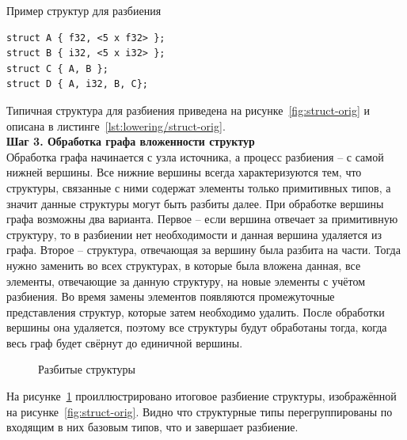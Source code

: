 \begin{ListingEnv}[!h]
    \captiondelim{ } 
    \caption{Пример структур для разбиения}\label{lst:lowering/struct-orig}
    \begin{lstlisting}[language={[ISO]C++}]
struct A { f32, <5 x f32> };
struct B { i32, <5 x i32> };
struct C { A, B };
struct D { A, i32, B, C};
    \end{lstlisting}
\end{ListingEnv}

Типичная структура для разбиения приведена на рисунке~\cref{fig:struct-orig} и описана в листинге~\cref{lst:lowering/struct-orig}.\\

\textbf{Шаг 3. Обработка графа вложенности структур}\\

Обработка графа начинается с узла источника, а процесс разбиения -- с самой нижней вершины. Все нижние вершины всегда характеризуются тем, что структуры, связанные с ними содержат элементы только примитивных типов, а значит данные структуры могут быть разбиты далее. При обработке вершины графа возможны два варианта.
Первое -- если вершина отвечает за примитивную структуру, то в разбиении нет необходимости и данная вершина удаляется из графа.
Второе -- структура, отвечающая за вершину была разбита на части. Тогда нужно заменить во всех структурах, в которые была вложена данная, все элементы, отвечающие за данную структуру, на новые элементы с учётом разбиения.
Во время замены элементов появляются промежуточные представления структур, которые затем необходимо удалить.
После обработки вершины она удаляется, поэтому все структуры будут обработаны тогда, когда весь граф будет свёрнут до единичной вершины.

\begin{figure}[ht]
    \caption{Разбитые структуры}\label{fig:struct-splitted}
\end{figure}

На рисунке~\cref{fig:struct-splitted} проиллюстрировано итоговое разбиение структуры, изображённой на рисунке~\cref{fig:struct-orig}.
Видно что структурные типы перегруппированы по входящим в них базовым типов, что и завершает разбиение.

